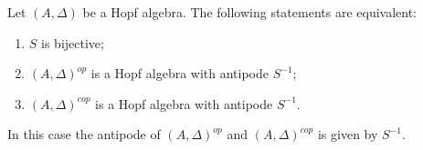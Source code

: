 \begin{proposition}     \label{PropAAopAcopHopfSSemu}
	Let \( (A,\Delta)\) be a Hopf algebra. The following statements are equivalent:
	\begin{enumerate}
		\item   \label{ItemPropAAopAcopHopfSSemui}
		      \( S\) is bijective;
		      \item\label{ItemPropAAopAcopHopfSSemuii}
		      \( (A,\Delta)^{op}\) is a Hopf algebra with antipode \( S^{-1}\);
		      \item\label{ItemPropAAopAcopHopfSSemuiii}
		      \( (A,\Delta)^{cop}\) is a Hopf algebra with antipode \( S^{-1}\).
	\end{enumerate}
	In this case the antipode of \( (A,\Delta)^{op}\) and \( (A,\Delta)^{cop}\) is given by \( S^{-1}\).
\end{proposition}

